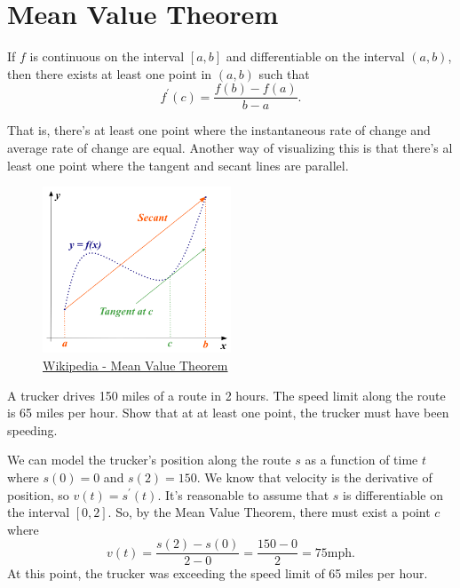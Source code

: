 \section{Mean Value Theorem}
\begin{theorem}
	If $f$ is continuous on the interval $[a,b]$ and differentiable on the interval $(a,b)$, then there exists at least one point in $(a,b)$ such that
	\begin{equation*}
		f^\prime(c) = \frac{f(b)-f(a)}{b-a}.
	\end{equation*}
\end{theorem}
\noindent
That is, there's at least one point where the instantaneous rate of change and average rate of change are equal.
Another way of visualizing this is that there's al least one point where the tangent and secant lines are parallel.

\begin{figure}[H]
	\label{mvt}
	\centering
	\includegraphics[width = 0.5\textwidth]{./applications_derivative/mvt.png}
	\caption{\hyperref{https://en.wikipedia.org/wiki/Mean\_value\_theorem}{}{}{Wikipedia - Mean Value Theorem}}
\end{figure}

\begin{example}
	A trucker drives 150 miles of a route in 2 hours.
	The speed limit along the route is 65 miles per hour.
	Show that at at least one point, the trucker must have been speeding.
\end{example}
We can model the trucker's position along the route $s$ as a function of time $t$ where $s(0)=0$ and $s(2)=150$.
We know that velocity is the derivative of position, so $v(t) = s^\prime(t)$.
It's reasonable to assume that $s$ is differentiable on the interval $[0,2]$.
So, by the Mean Value Theorem, there must exist a point $c$ where
\begin{equation*}
	v(t) = \frac{s(2)-s(0)}{2-0} = \frac{150-0}{2} = 75\text{mph}.
\end{equation*}
\indent
At this point, the trucker was exceeding the speed limit of 65 miles per hour.

